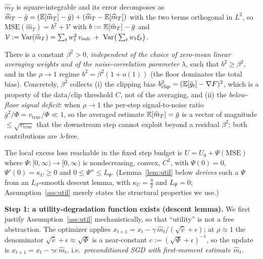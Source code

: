 \begin{assumption}\label{ass:est}
$\widehat m_T$ is square-integrable and its error decomposes as
$\widehat m_T-\bar g=(\mathbb{E}[\widehat m_T]-\bar g)+(\widehat m_T-\mathbb{E}[\widehat m_T])$ with the two terms
orthogonal in $L^2$, so $\mathrm{MSE}(\widehat m_T)=b^2+\mathcal V$ with $b:=\mathbb{E}[\widehat m_T]-\bar g$
and $\mathcal V:=\operatorname{Var}(\widehat m_T)=\sum_t w_t^2\,v_{\mathrm{sub}}\;+\;\operatorname{Var}\!\big(\sum_t w_t\xi_t\big)$.
\end{assumption}

\begin{assumption}\label{ass:floor}
There is a constant $\beta^2>0$, \emph{independent of the choice of zero-mean linear averaging
weights and of the noise-correlation parameter $\lambda$}, such that $b^2\ge\beta^2$, and in the
$\rho\to1$ regime $b^2=\beta^2(1+o(1))$ (the floor dominates the total bias). Concretely,
$\beta^2$ collects (i) the clipping bias $b_{\mathrm{clip}}^2=(\mathbb{E}[\bar g_t]-\nabla F)^2$, which is a
property of the data/clip threshold $C$, not of the averaging, and (ii) the
\emph{below-floor signal deficit}: when $\rho\to1$ the per-step signal-to-noise ratio
$\bar g^2/\Phi=v_{\mathrm{true}}/\Phi\ll1$, so the averaged estimate $\mathbb{E}[\widehat m_T]=\bar g$ is a
vector of magnitude $\le\sqrt{v_{\mathrm{true}}}$ that the downstream step cannot exploit beyond a
residual $\beta^2$; both contributions are $\lambda$-free.
\end{assumption}

\begin{assumption}\label{ass:util}
The local excess loss reachable in the fixed step budget is $U=U_0+\Psi(\mathrm{MSE})$ where
$\Psi:[0,\infty)\to[0,\infty)$ is nondecreasing, convex, $C^2$, with $\Psi(0)=0$,
$\Psi'(0)=\kappa_U\ge0$ and $0\le\Psi''\le L_\Psi$. (Lemma~\ref{lem:util} below \emph{derives} such
a $\Psi$ from an $L_F$-smooth descent lemma, with $\kappa_U=\tfrac{\eta}{2}$ and $L_\Psi=0$;
Assumption~\ref{ass:util} merely states the structural properties we use.)
\end{assumption}

\par\smallskip\noindent\textbf{Step 1: a utility-degradation function exists (descent lemma).}\quad 
We first justify Assumption~\ref{ass:util} mechanistically, so that ``utility'' is not a free
abstraction. The optimizer applies $x_{t+1}=x_t-\gamma\,\widehat m_t/(\sqrt{\hat v}+\epsilon)$;
at $\rho\approx1$ the denominator $\sqrt{\hat v}+\epsilon\approx\sqrt\Phi$ is a near-constant
$c:=(\sqrt\Phi+\epsilon)^{-1}$, so the update is $x_{t+1}=x_t-\gamma c\,\widehat m_t$, i.e.\
\emph{preconditioned SGD with first-moment estimate $\widehat m_t$}.

